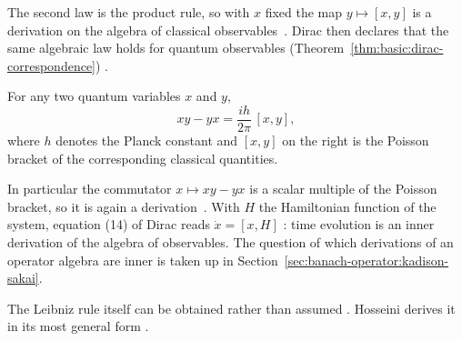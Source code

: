 The second law is the product rule, so with $x$ fixed the map $y\mapsto[x,y]$
is a derivation on the algebra of classical observables~\cite[p.~648]{Dirac1925}. Dirac then declares
that the same algebraic law holds for quantum observables
(Theorem~\ref{thm:basic:dirac-correspondence}) \cite[p.~648]{Dirac1925}.

\begin{theorem}\label{thm:basic:dirac-correspondence}
For any two quantum variables $x$ and $y$,
\[
xy-yx = \frac{ih}{2\pi}\,[x,y],
\]
where $h$ denotes the Planck constant and $[x,y]$ on the right is the Poisson
bracket of the corresponding classical quantities.
\end{theorem}

In particular the commutator $x\mapsto xy-yx$ is a scalar multiple of the
Poisson bracket, so it is again a derivation~\cite[equation (14), p.~651]{Dirac1925}. With $H$ the Hamiltonian
function of the system, equation (14) of Dirac reads $\dot x=[x,H]$
\cite[equation (14), p.~651]{Dirac1925}: time evolution is an inner derivation
of the algebra of observables. The question of which derivations of an
operator algebra are inner is taken up in
Section~\ref{sec:banach-operator:kadison-sakai}.


The Leibniz rule itself can be obtained rather than assumed \cite[Abstract,
p.~1]{Hosseini2022LeibnizRule}. Hosseini derives it in its most general form
\cite[Abstract, p.~1]{Hosseini2022LeibnizRule}.
